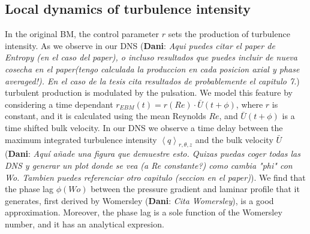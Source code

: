 \documentclass{article}
\DeclareRobustCommand{\dm}[1]{{\color{blue}(\textbf{Dani}: \textit{#1}\xspace)}}
\begin{document}
 





\subsection{Local dynamics of turbulence intensity}
In the original BM, the control parameter $r$ sets the production of turbulence intensity. As we observe in our DNS \dm{Aqui puedes citar el paper de Entropy (en el caso del paper), o incluso resultados que puedes incluir de nueva cosecha en el paper(tengo calculada la produccion en cada posicion axial y phase averaged!). En el caso de la tesis cita resultados de probablemente el capitulo 7.} turbulent production is modulated by the pulsation. We model this feature by considering a time dependant $r_{EBM}\left( t \right)= r \left( Re \right) \cdot \bar{U}\left(t+\phi\right)$, where $r$ is constant, and it is calculated using the mean Reynolds $Re$, and $\bar{U}\left(t + \phi\right)$ is a time shifted bulk velocity. In our DNS we observe a time delay between the maximum integrated turbulence intensity $\left \langle q \right \rangle_{r,\theta,z}$ and the bulk velocity $\bar{U}$ \dm{Aquí añade una figura que demuestre esto. Quizas puedas coger todas las DNS y generar un plot donde se vea (a Re constante?) como cambia "phi" con Wo. Tambien puedes referenciar otro capitulo (seccion en el paper)}. We find that the phase lag $\phi \left(Wo\right)$ between the pressure gradient and laminar profile that it generates, first derived by Womersley \dm{Cita Womersley}, is a good approximation. Moreover, the phase lag is a sole function of the Womersley number, and it has an analytical expresion.
\end{document}
